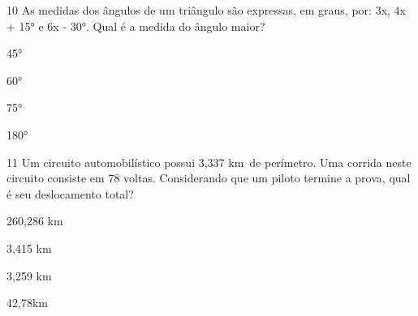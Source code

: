 






\num{10} As medidas dos ângulos de um triângulo são expressas, em graus, por:
3x, 4x + 15° e 6x - 30°. Qual é a medida do ângulo maior?
\item 45°
\item 60°
\item 75°
\item 180°












\num{11} Um circuito automobilístico possui 3,337 km~de perímetro. Uma
corrida neste circuito consiste em 78 voltas. Considerando que um piloto
termine a prova, qual é seu deslocamento total?
\item 260,286 km
\item 3,415 km
\item 3,259 km
\item 42,78km

